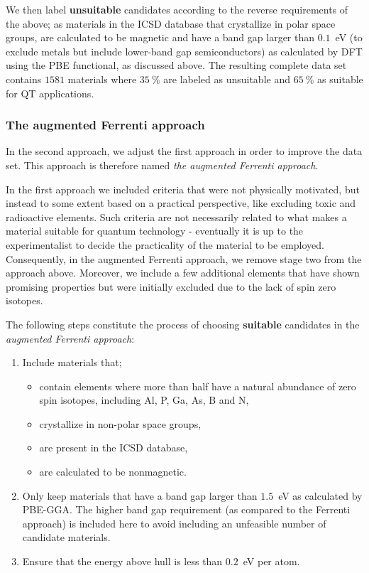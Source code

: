 \documentclass[superscriptaddress,unsortedaddress,
 amsmath,amssymb,
 aps,
]{revtex4-2}
\begin{document}
We then label \textbf{unsuitable} candidates according to the reverse requirements of the above; as materials in the ICSD database \cite{Allen1987,Zagorac2019} %
that crystallize in polar space groups, are calculated to be magnetic and have a band gap larger than $0.1$~eV (to exclude metals but include lower-band gap semiconductors) as calculated by DFT using the PBE functional, as discussed above.
The resulting complete data set contains $1581$ materials where %
$35 \ \%$
are labeled as unsuitable and 
$65 \ \%$
as suitable for QT applications. 

\subsubsection*{The augmented Ferrenti approach}
In the second approach, we adjust the first approach in order to improve the data set. This approach is therefore named \emph{the augmented Ferrenti approach}.

In the first approach we included criteria that were not physically motivated, but instead to some extent based on a  practical perspective, like excluding toxic and radioactive elements. Such criteria are not necessarily related to what makes a material suitable for quantum technology - eventually it is up to the experimentalist to decide the practicality of the material to be employed. 
Consequently, in the augmented Ferrenti approach, we remove stage two from the approach above. Moreover, we include a few additional elements that have shown promising properties but were initially excluded due to the lack of spin zero isotopes. 

The following steps constitute the process of choosing \textbf{suitable} candidates 
in the \emph{augmented Ferrenti approach}:
\begin{enumerate}
    \item Include materials that; 
    \begin{itemize}
        \item contain elements where more than half have a natural abundance of zero spin isotopes, including Al, P, Ga, As, B and N, 
        \item crystallize in non-polar space groups,
        \item are present in the ICSD database,
        \item are calculated to be nonmagnetic. 
    \end{itemize}
    \item Only keep materials that have a band gap larger than $1.5$~eV as calculated by PBE-GGA. The higher band gap requirement (as compared to the Ferrenti approach) is included here to avoid including an unfeasible number of candidate materials. 
    \item Ensure that the energy above hull is less than $0.2$~eV per atom. 
\end{enumerate}
\end{document}
